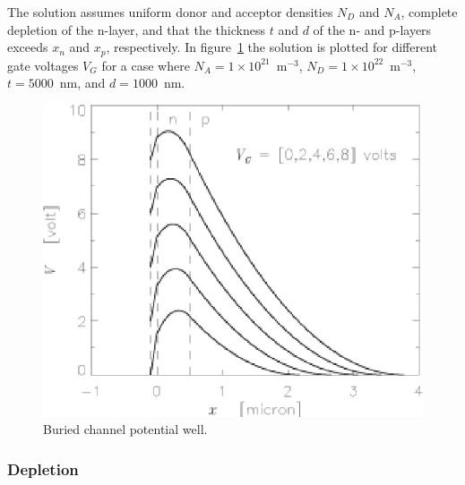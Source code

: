 The solution assumes uniform donor and acceptor densities $N_D$ and
$N_A$, complete depletion of the n-layer, and that the thickness $t$
and $d$ of the n- and p-layers exceeds $x_n$ and $x_p$, respectively.
In figure~\ref{CCD.figburchan} the solution is plotted for different
gate voltages $V_G$ for a case where 
$N_A = 1\times 10^{21}$~m$^{-3}$, $N_D = 1\times 10^{22}$~m$^{-3}$, 
$t = 5000$~nm, and $d = 1000$~nm.

\begin{figure}[h]
  \centering
	\includegraphics{CCD_burchan.eps}
  \caption{Buried channel potential well.}
  \label{CCD.figburchan}
\end{figure}


\subsubsection{Depletion}


